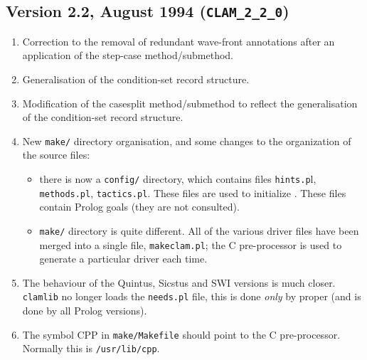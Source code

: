 \subsection {Version 2.2, August 1994 ({\tt CLAM\_2\_2\_0})}
\begin{enumerate}
\item Correction to the removal of redundant wave-front annotations
      after an application of the step-case method/submethod.

\item Generalisation of the condition-set record structure. 

\item Modification of the casesplit method/submethod to reflect
      the generalisation of the condition-set record structure.

\item New \verb|make/| directory organisation, and some changes to the 
  organization of the source files:

\begin{itemize}

\item there is now a \verb|config/| directory, which contains
        files \verb|hints.p|l, \verb|methods.pl|, \verb|tactics.pl|.
These files     are used to initialize \clam{}.  These files contain
Prolog goals (they are not consulted).

\item \verb|make/| directory is quite different.  All of the various
        driver files have been merged into a single file,
        \verb|makeclam.pl|;  the C pre-processor is used to generate
        a particular driver each time.  

\end{itemize}

 \item The behaviour of the Quintus, Sicstus and SWI versions is much
closer.  \verb|clamlib| no longer loads the \verb|needs.pl| file, this
is done {\em only\/} by \clam{} proper (and is done by all Prolog
versions).

      \item The symbol CPP in \verb|make/Makefile| should point to the 
        C pre-processor.  Normally this is \verb|/usr/lib/cpp|.


\end{enumerate}
